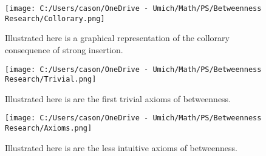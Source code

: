 \documentclass[a4paper,man,natbib]{apa6}
\begin{document}
\begin{figure}

      \centering
      \texttt{[image: C:/Users/cason/OneDrive - Umich/Math/PS/Betweenness Research/Collorary.png]}
      \caption{\label{C:/Users/cason/OneDrive - Umich/Math/PS/Betweenness Research/Collorary.png}
      Illustrated here is a graphical representation of the collorary consequence of strong insertion.}

\end{figure}

\begin{figure}

      \centering
      \texttt{[image: C:/Users/cason/OneDrive - Umich/Math/PS/Betweenness Research/Trivial.png]}
      \caption{\label{C:/Users/cason/OneDrive - Umich/Math/PS/Betweenness Research/Trivial.png}
      Illustrated here is are the first trivial axioms of betweenness.}

\end{figure}

\begin{figure}

      \centering
      \texttt{[image: C:/Users/cason/OneDrive - Umich/Math/PS/Betweenness Research/Axioms.png]}
      \caption{\label{C:/Users/cason/OneDrive - Umich/Math/PS/Betweenness Research/Axioms.png}
      Illustrated here is are the less intuitive axioms of betweenness.}

\end{figure}
\end{document}
